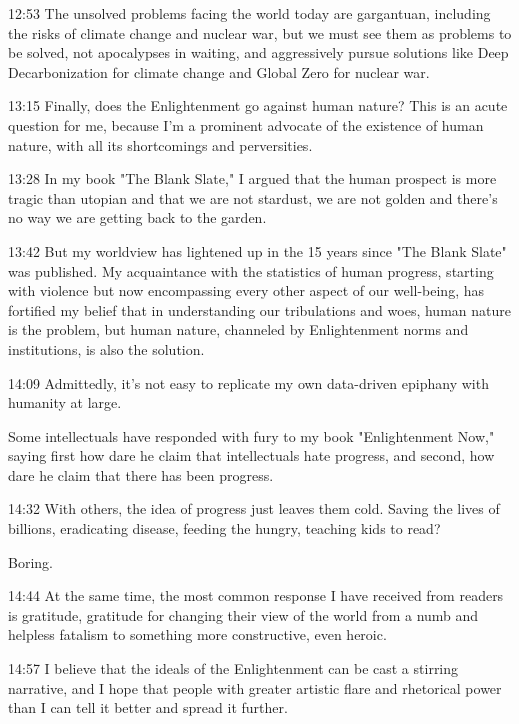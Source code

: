 \documentclass[10pt,titlepage]{article}
\begin{document}
12:53
The unsolved problems facing the world today are gargantuan,
including the risks of climate change
and nuclear war,
but we must see them as problems to be solved,
not apocalypses in waiting,
and aggressively pursue solutions
like Deep Decarbonization for climate change
and Global Zero for nuclear war.

13:15
Finally, does the Enlightenment go against human nature?
This is an acute question for me,
because I'm a prominent advocate of the existence of human nature,
with all its shortcomings and perversities.

13:28
In my book "The Blank Slate,"
I argued that the human prospect is more tragic than utopian
and that we are not stardust, we are not golden
and there's no way we are getting back to the garden.

13:42
But my worldview has lightened up
in the 15 years since "The Blank Slate" was published.
My acquaintance with the statistics of human progress,
starting with violence
but now encompassing every other aspect of our well-being,
has fortified my belief
that in understanding our tribulations and woes,
human nature is the problem,
but human nature, channeled by Enlightenment norms and institutions,
is also the solution.

14:09
Admittedly, it's not easy to replicate my own data-driven epiphany
with humanity at large.

Some intellectuals have responded
with fury to my book "Enlightenment Now,"
saying first how dare he claim that intellectuals hate progress,
and second, how dare he claim that there has been progress.

14:32
With others, the idea of progress just leaves them cold.
Saving the lives of billions,
eradicating disease, feeding the hungry,
teaching kids to read?

Boring.

14:44
At the same time, the most common response I have received from readers is gratitude,
gratitude for changing their view of the world
from a numb and helpless fatalism
to something more constructive,
even heroic.

14:57
I believe that the ideals of the Enlightenment
can be cast a stirring narrative,
and I hope that people with greater artistic flare
and rhetorical power than I
can tell it better and spread it further.
\end{document}
